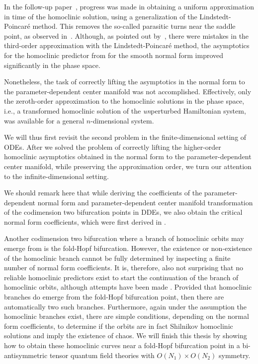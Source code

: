 In the follow-up paper~\cite{Al-Hdaibat2016}, progress was made in obtaining a
uniform approximation in time of the homoclinic solution, using a generalization
of the Lindstedt-Poincar\'e method. This removes the so-called parasitic turns
near the saddle point, as observed in~\cite{Kuznetsov2014improved}. Although, as
pointed out by~\cite{Algaba_2019}, there were mistakes in the third-order
approximation with the Lindstedt-Poincar\'e method, the asymptotics for the
homoclinic predictor from \cite{Kuznetsov2014improved} for the smooth normal form
improved significantly in the phase space.

Nonetheless, the task of correctly lifting the asymptotics in the normal form to
the parameter-dependent center manifold was not accomplished. Effectively, only
the zeroth-order approximation to the homoclinic solutions in the phase space,
i.e., a transformed homoclinic solution of the \emph{un}perturbed Hamiltonian
system, was available for a general $n$-dimensional system.

We will thus first revisit the second problem in the finite-dimensional setting
of ODEs. After we solved the problem of correctly lifting the higher-order
homoclinic asymptotics obtained in the normal form to the parameter-dependent
center manifold, while preserving the approximation order, we turn our attention
to the infinite-dimensional setting. 

We should remark here that while deriving the coefficients of the
parameter-dependent normal form and parameter-dependent center manifold
transformation of the codimension two bifurcation points in DDEs, we also obtain the
critical normal form coefficients, which were first derived in
\cite{Janssens:Thesis}.

Another codimension two bifurcation where a branch of homoclinic orbits may
emerge from is the fold-Hopf bifurcation. However, the existence or non-existence
of the homoclinic branch cannot be fully determined by inspecting a finite number
of normal form coefficients. It is, therefore, also not surprising that no reliable
homoclinic predictors exist to start the continuation of the branch of homoclinic
orbits, although attempts have been made \cite{Budac:Thesis}. Provided that
homoclinic branches do emerge from the fold-Hopf bifurcation point, then there
are automatically two such branches. Furthermore, again under the
assumption the homoclinic branches exist, there are simple conditions, depending
on the normal form coefficients, to determine if the orbits are in fact Shilnikov
homoclinic solutions \cite{baldoma2020hopf} and imply the existence of chaos. We
will finish this thesis by showing how to obtain these homoclinic curves near a
fold-Hopf bifurcation point in a bi-antisymmetric tensor quantum field theories
with $O(N_1)\times O(N_2)$ symmetry.

